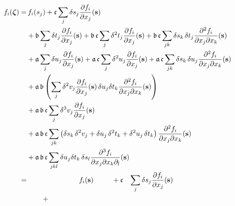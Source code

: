 \begin{align*}
f_{i} \! \left( \mbox{\boldmath{$\zeta$}} \right)
%
=& \,
f_{i} \! \left( s_{j} \right) + \mathfrak{c} \sum_{j} \delta s_{j} 
\frac{ \partial f_{i} }{ \partial x_{j} } \! \left( \mathbf{s} \right)
\\
&+ 
\mathfrak{b} \sum_{j} \delta t_{j} \frac{ \partial f_{i} }{ \partial x_{j} } \! \left( \mathbf{s} \right)
+ \mathfrak{b} \, \mathfrak{c} \sum_{j} \delta^{2} t_{j} 
\frac{ \partial f_{i} }{ \partial x_{j} } \! \left( \mathbf{s} \right) 
+ \mathfrak{b} \, \mathfrak{c} \sum_{jk} \delta s_{k} \, \delta t_{j} 
\frac{ \partial^{2} f_{i} }{ \partial x_{j} \partial x_{k} } \! \left( \mathbf{s} \right)
\\
&+ 
\mathfrak{a} \sum_{j} \delta u_{j} \frac{ \partial f_{i} }{ \partial x_{j} } \! \left( \mathbf{s} \right)
+ \mathfrak{a} \, \mathfrak{c} \sum_{j} \delta^{2} u_{j} 
\frac{ \partial f_{i} }{ \partial x_{j} } \! \left( \mathbf{s} \right) 
+ \mathfrak{a} \, \mathfrak{c} \sum_{jk} \delta s_{k} \, \delta u_{j} 
\frac{ \partial^{2} f_{i} }{ \partial x_{j} \partial x_{k} } \! \left( \mathbf{s} \right)
\\
&+ 
\mathfrak{a} \, \mathfrak{b} 
\left( 
\sum_{j} \delta^{2} v_{j} \frac{ \partial f_{i} }{ \partial x_{j} } \! \left( \mathbf{s} \right)
\delta u_{j} \delta t_{k} 
\frac{ \partial^{2} f_{i} }{ \partial x_{j} \partial x_{k} } \! \left( \mathbf{s} \right)
\right)
\\
&+ \mathfrak{a} \, \mathfrak{b} \, \mathfrak{c} \sum_{j} \delta^{3} v_{j} 
\frac{ \partial f_{i} }{ \partial x_{j} } \! \left( \mathbf{s} \right) 
\\
&+ \mathfrak{a} \, \mathfrak{b} \, \mathfrak{c} \sum_{jk}
\left( 
\delta s_{k} \, \delta^{2} v_{j} + \delta u_{j} \, \delta^{2} t_{k} + \delta^{2} u_{j} \, \delta t_{k}  \right)
\frac{ \partial^{2} f_{i} }{ \partial x_{j} \partial x_{k} } \! \left( \mathbf{s} \right) 
\\
&+
\mathfrak{a} \, \mathfrak{b} \, \mathfrak{c} \sum_{jkl}
\delta u_{j} \delta t_{k} \, \delta s_{l} 
\frac{ \partial^{3} f_{i} }{ \partial x_{j} \partial x_{k} \partial_{l} } \! \left( \mathbf{s} \right)
\\
%
=& \hspace{26mm} 
f_{i} \! \left( \mathbf{s} \right) 
\hspace{9mm}
+ \mathfrak{c} 
\hspace{3mm}
\sum_{j} \delta s_{j} 
\frac{ \partial f_{i} }{ \partial x_{j} } \! \left( \mathbf{s} \right)
\\
& \hspace{8mm} + 

\end{align*}
